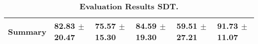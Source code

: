 \begin{table}[htb]
{\begin{tabular}{llllll}
\midrule
\textbf{Summary                                  } &                  \phantom{0}82.83 $\pm$ 20.47 &                      \phantom{0}75.57 $\pm$ 15.30 &                  \phantom{0}84.59 $\pm$ 19.30 &                  \phantom{0}59.51 $\pm$ 27.21 &            \phantom{0}91.73 $\pm$ 11.07 \\
\bottomrule
\end{tabular}%
}
\caption{\textbf{Evaluation Results SDT.}}
\label{tab:eval-results}
\end{table}


